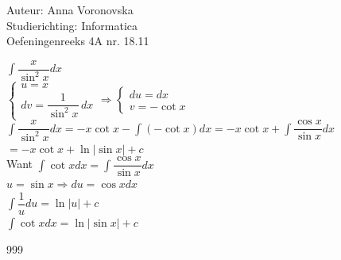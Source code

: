 \documentclass[a4paper]{article}
\begin{document}
  
\noindent \large Auteur: Anna Voronovska \\
\noindent \large Studierichting: Informatica\\
\noindent \large Oefeningenreeks 4A nr. 18.11\\

\medskip

\normalsize
$\displaystyle\int \dfrac{x}{\sin^2 x}dx$\\

$\left\{ \begin{array}{l} 
    u = x \\ 
    dv = \dfrac{1}{\sin^2 x} \, dx 
\end{array} \right.
\Rightarrow
\left\{ \begin{array}{l} 
    du = dx \\ 
    v = -\cot x 
\end{array} \right.$\\

$\displaystyle\int \dfrac{x}{\sin^2 x}dx = -x \cot x - \displaystyle\int (-\cot x)dx = -x \cot x + \displaystyle\int \dfrac{\cos x}{\sin x}dx $\\

$= -x \cot x + \ln|\sin x| + c$\\

Want $ \displaystyle\int \cot xdx = \displaystyle\int \dfrac{\cos x}{\sin x}dx $\\

$u = \sin x \Rightarrow du = \cos xdx$\\

$ \displaystyle\int \dfrac{1}{u}du = \ln|u| + c $\\

$ \displaystyle\int \cot xdx = \ln|\sin x| + c $\\

\begin{thebibliography}{999}
\end{thebibliography}
\end{document}
